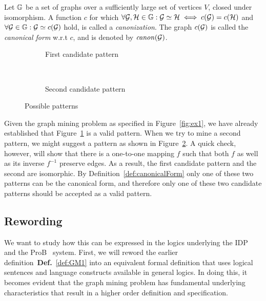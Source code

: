 \begin{definition}
\label{def:canonicalForm}
Let $\mathbb{G}$ be a set of graphs over a sufficiently large set of vertices $V$, closed under isomorphism.
A function $c$ for which $\forall \mathcal{G,H} \in \mathbb{G} : \mathcal{G} \simeq \mathcal{H} \iff c(\mathcal{G}) = c(\mathcal{H})$ and $\forall \mathcal{G} \in \mathbb{G} : \mathcal{G} \simeq c(\mathcal{G})$ hold, is called a \emph{canonization}.
The graph $c(\mathcal{G})$ is called the \emph{canonical form} w.r.t $c$, and is denoted by $\mathit{canon}(\mathcal{G})$.
\end{definition}

\begin{figure}[h]
  \centering
  \begin{subfigure}[b]{0.45\textwidth}
    \centering
    \caption{First candidate pattern\label{fig:iso1}}
  \end{subfigure}
  ~
  \begin{subfigure}[b]{0.45\textwidth}
    \centering
    \caption{Second candidate pattern\label{fig:iso2}}
  \end{subfigure}
  \caption{Possible patterns\label{fig:isomorphism}}
\end{figure}

Given the graph mining problem as specified in Figure~\ref{fig:ex1}, we have already established that Figure~\ref{fig:iso1} is a valid pattern.
When we try to mine a second pattern, we might suggest a pattern as shown in Figure~\ref{fig:iso2}.
A quick check, however, will show that there is a one-to-one mapping $f$ such that both $f$ as well as its inverse $f^{-1}$ preserve edges.
As a result, the first candidate pattern and the second are isomorphic.
By Definition~\ref{def:canonicalForm} only one of these two patterns can be the canonical form, and therefore only one of these two candidate patterns should be accepted as a valid pattern.

\subsection{Rewording}
We want to study how this can be expressed in the logics underlying the IDP~\cite{} and the ProB~\cite{} system.
First, we will reword the earlier definition~\textbf{Def.}~\ref{def:GM1} into an equivalent formal definition that uses logical sentences and language constructs available in general logics.
In doing this, it becomes evident that the graph mining problem has fundamental underlying characteristics that result in a higher order definition and specification.

